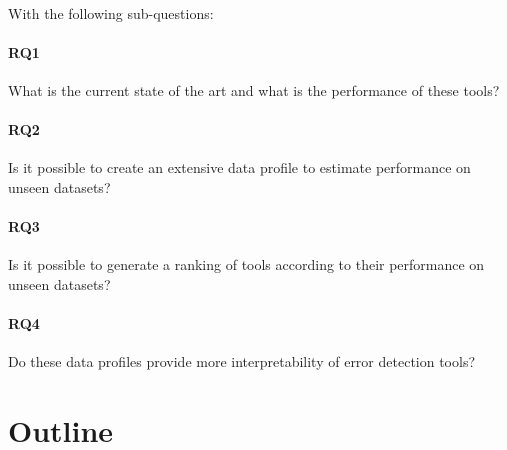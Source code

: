 ~\\With the following sub-questions:
\paragraph{RQ1} What is the current state of the art and what is the performance of these tools?

\paragraph{RQ2} Is it possible to create an extensive data profile to estimate performance on unseen datasets?

\paragraph{RQ3} Is it possible to generate a ranking of tools according to their performance on unseen datasets?

\paragraph{RQ4} Do these data profiles provide more interpretability of error detection tools?


\section{Outline}
\label{sec:outline}

